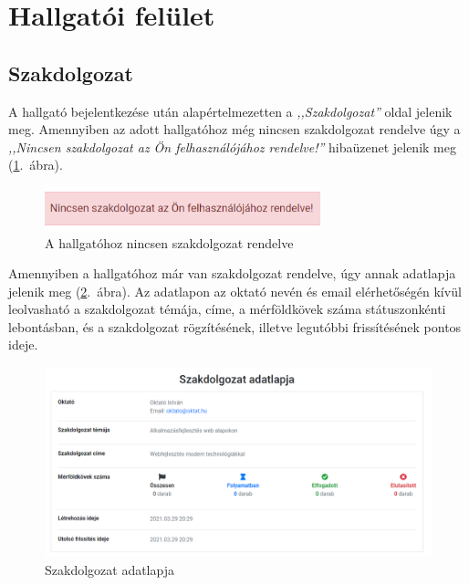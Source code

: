 \documentclass[
]{thesis-ekf}
\theoremstyle{definition}
\theoremstyle{remark}
\begin{document}
	\newpage
	
	\section{Hallgatói felület}
	\subsection{Szakdolgozat}
	A hallgató bejelentkezése után alapértelmezetten a \emph{,,Szakdolgozat''} oldal jelenik meg. Amennyiben az adott hallgatóhoz még nincsen szakdolgozat rendelve úgy a \emph{,,Nincsen szakdolgozat az Ön felhasználójához rendelve!''} hibaüzenet jelenik meg (\ref{fig:hallgato_szakdolgozat_nincs}.~ábra).
	
	\begin{figure}[!h]
		\centering
		\includegraphics[width=8cm]{kepek/screenshots/hallgato_szakdolgozat_nincs.png}
		\caption{A hallgatóhoz nincsen szakdolgozat rendelve}
		\label{fig:hallgato_szakdolgozat_nincs}
	\end{figure}
	
	Amennyiben a hallgatóhoz már van szakdolgozat rendelve, úgy annak adatlapja jelenik meg (\ref{fig:hallgato_szakdolgozat_adatlap}.~ábra). Az adatlapon az oktató nevén és email elérhetőségén kívül leolvasható a szakdolgozat témája, címe, a mérföldkövek száma státuszonkénti lebontásban, és a szakdolgozat rögzítésének, illetve legutóbbi frissítésének pontos ideje.
	
	\begin{figure}[!h]
		\centering
		\includegraphics[width=12cm]{kepek/screenshots/hallgato_szakdolgozat_adatlap.png}
		\caption{Szakdolgozat adatlapja}
		\label{fig:hallgato_szakdolgozat_adatlap}
	\end{figure}
	
\end{document}
